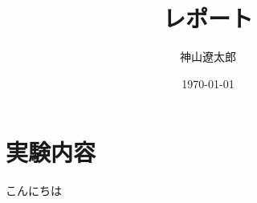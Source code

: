 \documentclass{jsarticle}
\title{レポート}
\author{神山遼太郎}
\date{\today}
\begin{document}
\maketitle

\section{実験内容}

こんにちは
\end{document}
